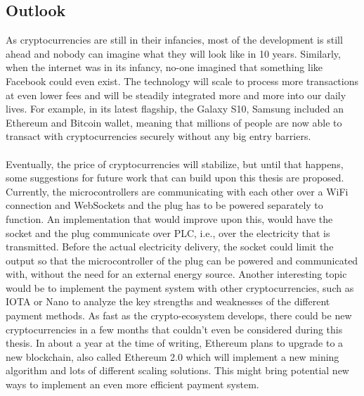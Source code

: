 \subsection{Outlook}
As cryptocurrencies are still in their infancies, most of the development is still ahead and nobody can imagine what they will look like in 10 years.
Similarly, when the internet was in its infancy, no-one imagined that something like Facebook could even exist.
The technology will scale to process more transactions at even lower fees and will be steadily integrated more and more into our daily lives.
For example, in its latest flagship, the Galaxy S10, Samsung included an Ethereum and Bitcoin wallet, meaning that millions of people are now able to transact with cryptocurrencies securely without any big entry barriers.
\\\\
Eventually, the price of cryptocurrencies will stabilize, but until that happens, some suggestions for future work that can build upon this thesis are proposed.
Currently, the microcontrollers are communicating with each other over a WiFi connection and WebSockets and the plug has to be powered separately to function.
An implementation that would improve upon this, would have the socket and the plug communicate over PLC, i.e., over the electricity that is transmitted.
Before the actual electricity delivery, the socket could limit the output so that the microcontroller of the plug can be powered and communicated with, without the need for an external energy source.
Another interesting topic would be to implement the payment system with other cryptocurrencies, such as IOTA or Nano to analyze the key strengths and weaknesses of the different payment methods.
As fast as the crypto-ecosystem develops, there could be new cryptocurrencies in a few months that couldn’t even be considered during this thesis.
In about a year at the time of writing, Ethereum plans to upgrade to a new blockchain, also called Ethereum 2.0\cite{eth-2} which will implement a new mining algorithm and lots of different scaling solutions.
This might bring potential new ways to implement an even more efficient payment system.